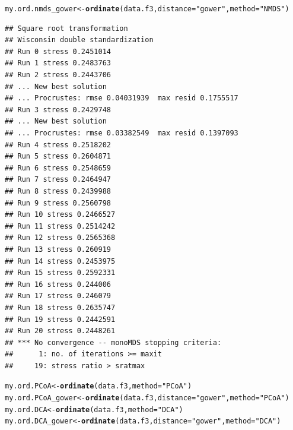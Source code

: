 \documentclass[12pt]{article}\usepackage[]{graphicx}\usepackage[]{color}
\makeatletter
\newcommand{\hlstr}[1]{\textcolor[rgb]{0.192,0.494,0.8}{#1}}%
\newcommand{\hlstd}[1]{\textcolor[rgb]{0.345,0.345,0.345}{#1}}%
\newcommand{\hlkwb}[1]{\textcolor[rgb]{0.69,0.353,0.396}{#1}}%
\newcommand{\hlkwc}[1]{\textcolor[rgb]{0.333,0.667,0.333}{#1}}%
\newcommand{\hlkwd}[1]{\textcolor[rgb]{0.737,0.353,0.396}{\textbf{#1}}}%
\newenvironment{kframe}{%
 \def\at@end@of@kframe{}%
 \ifinner\ifhmode%
  \def\at@end@of@kframe{\end{minipage}}%
  \begin{minipage}{\columnwidth}%
 \fi\fi%
 \def\FrameCommand##1{\hskip\@totalleftmargin \hskip-\fboxsep
 \colorbox{shadecolor}{##1}\hskip-\fboxsep
     \hskip-\linewidth \hskip-\@totalleftmargin \hskip\columnwidth}%
 \MakeFramed {\advance\hsize-\width
   \@totalleftmargin\z@ \linewidth\hsize
   \@setminipage}}%
 {\par\unskip\endMakeFramed%
 \at@end@of@kframe}
\newenvironment{knitrout}{}{} %
\numberwithin{figure}{section}
\makeatother
\begin{document}
\begin{knitrout}\small
{}\color{fgcolor}\begin{kframe}
\begin{alltt}
\hlstd{my.ord.nmds_gower} \hlkwb{<-} \hlkwd{ordinate}\hlstd{(data.f3,} \hlkwc{distance} \hlstd{=} \hlstr{"gower"}\hlstd{,}  \hlkwc{method} \hlstd{=} \hlstr{"NMDS"}\hlstd{)}
\end{alltt}
\begin{verbatim}
## Square root transformation
## Wisconsin double standardization
## Run 0 stress 0.2451014 
## Run 1 stress 0.2483763 
## Run 2 stress 0.2443706 
## ... New best solution
## ... Procrustes: rmse 0.04031939  max resid 0.1755517 
## Run 3 stress 0.2429748 
## ... New best solution
## ... Procrustes: rmse 0.03382549  max resid 0.1397093 
## Run 4 stress 0.2518202 
## Run 5 stress 0.2604871 
## Run 6 stress 0.2548659 
## Run 7 stress 0.2464947 
## Run 8 stress 0.2439988 
## Run 9 stress 0.2560798 
## Run 10 stress 0.2466527 
## Run 11 stress 0.2514242 
## Run 12 stress 0.2565368 
## Run 13 stress 0.260919 
## Run 14 stress 0.2453975 
## Run 15 stress 0.2592331 
## Run 16 stress 0.244006 
## Run 17 stress 0.246079 
## Run 18 stress 0.2635747 
## Run 19 stress 0.2442591 
## Run 20 stress 0.2448261 
## *** No convergence -- monoMDS stopping criteria:
##      1: no. of iterations >= maxit
##     19: stress ratio > sratmax
\end{verbatim}
\begin{alltt}
\hlstd{my.ord.PCoA} \hlkwb{<-} \hlkwd{ordinate}\hlstd{(data.f3,} \hlkwc{method} \hlstd{=} \hlstr{"PCoA"}\hlstd{)}
\hlstd{my.ord.PCoA_gower} \hlkwb{<-} \hlkwd{ordinate}\hlstd{(data.f3,} \hlkwc{distance} \hlstd{=} \hlstr{"gower"}\hlstd{,} \hlkwc{method} \hlstd{=} \hlstr{"PCoA"}\hlstd{)}
\hlstd{my.ord.DCA} \hlkwb{<-} \hlkwd{ordinate}\hlstd{(data.f3,} \hlkwc{method} \hlstd{=} \hlstr{"DCA"}\hlstd{)}
\hlstd{my.ord.DCA_gower} \hlkwb{<-} \hlkwd{ordinate}\hlstd{(data.f3,} \hlkwc{distance} \hlstd{=} \hlstr{"gower"}\hlstd{,} \hlkwc{method} \hlstd{=} \hlstr{"DCA"}\hlstd{)}


\end{alltt}
\end{kframe}
\end{knitrout}
\end{document}
